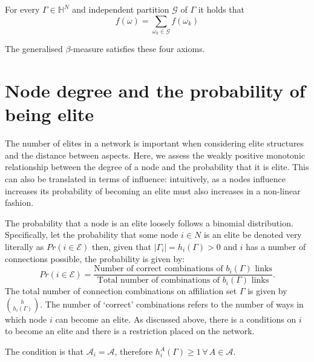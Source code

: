 \begin{subappendices}
\begin{axiom} \label{ax:4}
For every $\Gamma \in \mathbb{H}^{N}$ and independent partition $\mathcal{G}$ of $\Gamma$ it holds that
\begin{equation}
f(\omega) = \sum_{\omega_{k} \in \mathcal{G}} f(\omega_{k})
\end{equation}
\end{axiom}

The generalised $\beta$-measure satisfies these four axioms.

\section[Degree and probabilistic eliteness]{Node degree and the probability of being elite} \label{AppA}

The number of elites in a network is important when considering elite structures and the distance between aspects. Here, we assess the weakly positive monotonic relationship between the degree of a node and the probability that it is elite. This can also be translated in terms of influence: intuitively, as a nodes influence increases its probability of becoming an elite must also increases in a non-linear fashion.

The probability that a node is an elite loosely follows a binomial distribution. Specifically, let the probability that some node $i \in N$ is an elite be denoted very literally as $Pr(i \in \mathcal{E})$ then, given that $| \Gamma_{i} | = h_{i}(\Gamma) > 0$ and $i$ has a number of connections possible, the probability is given by:
\[
Pr(i \in \mathcal{E}) = \frac{\mbox{Number of correct combinations of $b_{i}(\Gamma)$ links}}{\mbox{Total number of combinations of $b_{i}(\Gamma)$ links}}.
\]
The total number of connection combinations on affiliation set $\Gamma$ is given by $\binom{h}{h_{i}(\Gamma)}$. The number of `correct' combinations refers to the number of ways in which node $i$ can become an elite. As discussed above, there is a conditions on $i$ to become an elite and there is a restriction placed on the network.

\begin{abet}
\item The condition is that $\mathcal{A}_{i} = \mathcal{A}$, therefore $h^{A}_{i}(\Gamma) \geqslant 1 \, \forall \, A \in \mathcal{A}$.


\end{abet}
\end{subappendices}
